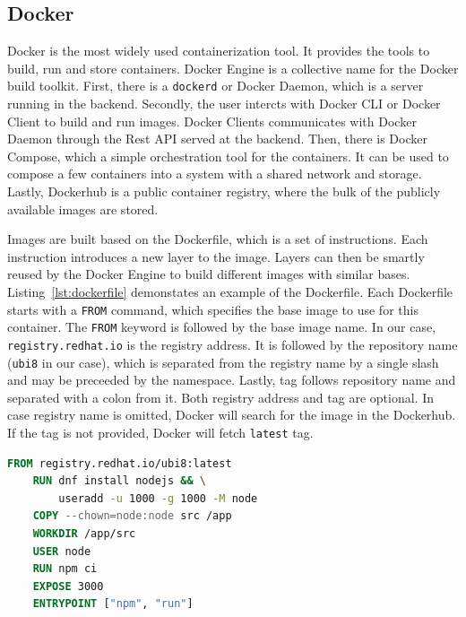 \subsection{Docker}
    
Docker is the most widely used containerization tool. It provides the tools to build, run and store containers. Docker Engine is a collective name for the Docker build toolkit. First, there is a \lstinline{dockerd} or Docker Daemon, which is a server running in the backend. Secondly, the user intercts with Docker CLI or Docker Client to build and run images. Docker Clients communicates with Docker Daemon through the Rest API served at the backend. Then, there is Docker Compose, which a simple orchestration tool for the containers. It can be used to compose a few containers into a system with a shared network and storage. Lastly, Dockerhub is a public container registry, where the bulk of the publicly available images are stored.

Images are built based on the Dockerfile, which is a set of instructions. Each instruction introduces a new layer to the image. Layers can then be smartly reused by the Docker Engine to build different images with similar bases. Listing~\ref{lst:dockerfile} demonstates an example of the Dockerfile. Each Dockerfile starts with a \lstinline{FROM} command, which specifies the base image to use for this container. The \lstinline{FROM} keyword is followed by the base image name. In our case, \lstinline{registry.redhat.io} is the registry address. It is followed by the repository name (\lstinline{ubi8} in our case), which is separated from the registry name by a single slash and may be preceeded by the namespace. Lastly, tag follows repository name and separated with a colon from it. Both registry address and tag are optional. In case registry name is omitted, Docker will search for the image in the Dockerhub. If the tag is not provided, Docker will fetch \lstinline{latest} tag.

\begin{lstlisting}[language=Dockerfile, caption={[A simple Dockerfile for a NodeJS app] A simple Dockerfile for a NodeJS app.}, label={lst:dockerfile}]
    FROM registry.redhat.io/ubi8:latest
    RUN dnf install nodejs && \
        useradd -u 1000 -g 1000 -M node
    COPY --chown=node:node src /app
    WORKDIR /app/src
    USER node
    RUN npm ci
    EXPOSE 3000
    ENTRYPOINT ["npm", "run"]
\end{lstlisting}

